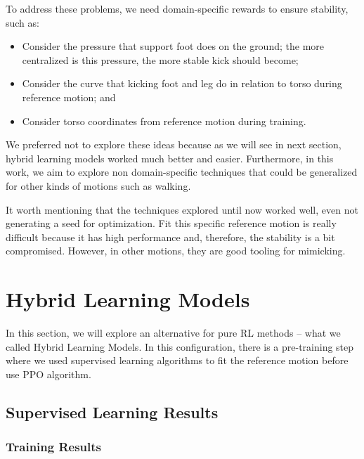 To address these problems, we need domain-specific rewards to ensure stability, such as:

\begin{itemize}
	\item Consider the pressure that support foot does on the ground; the more centralized is this pressure, the more stable kick should become;
	\item Consider the curve that kicking foot and leg do in relation to torso during reference motion; and
	\item Consider torso coordinates from reference motion during training.
\end{itemize}

We preferred not to explore these ideas because as we will see in next section, hybrid learning models worked much better and easier. Furthermore, in this work, we aim to explore non domain-specific techniques that could be generalized for other kinds of motions such as walking.

It worth mentioning that the techniques explored until now worked well, even not generating a seed for optimization. Fit this specific reference motion is really difficult because it has high performance and, therefore, the stability is a bit compromised. However, in other motions, they are good tooling for mimicking.

\section{Hybrid Learning Models}
In this section, we will explore an alternative for pure RL methods -- what we called Hybrid Learning Models. In this configuration, there is a pre-training step where we used supervised learning algorithms to fit the reference motion before use PPO algorithm.

\subsection{Supervised Learning Results}
\subsubsection{Training Results}

